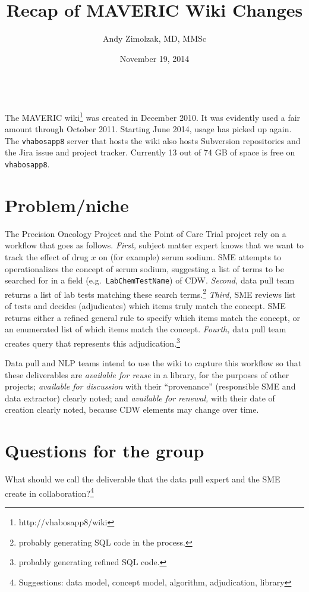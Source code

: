 \documentclass{tufte-handout}
\title{Recap of MAVERIC Wiki Changes}
\author{Andy Zimolzak, MD, MMSc}
\date{November 19, 2014}
\begin{document}
\maketitle

~\\

The MAVERIC wiki\footnote{http://vhabosapp8/wiki} was created in
December 2010. It was evidently used a fair amount through October
2011. Starting June 2014, usage has picked up again. The
\texttt{vhabosapp8} server that hosts the wiki also hosts Subversion
repositories and the Jira issue and project tracker. Currently 13 out
of 74 GB of space is free on \texttt{vhabosapp8}.

\section{Problem/niche}

The Precision Oncology Project and the Point of Care Trial project
rely on a workflow that goes as follows. \emph{First,} subject matter
expert knows that we want to track the effect of drug $x$ on (for
example) serum sodium. SME attempts to operationalizes the concept of
serum sodium, suggesting a list of terms to be searched for in a field
(e.g.\ \texttt{LabChemTestName}) of CDW. \emph{Second,} data pull team
returns a list of lab tests matching these search
terms.\footnote{probably generating SQL code in the process.}
\emph{Third,} SME reviews list of tests and decides (adjudicates)
which items truly match the concept. SME returns either a refined
general rule to specify which items match the concept, or an
enumerated list of which items match the concept. \emph{Fourth,} data
pull team creates query that represents this
adjudication.\footnote{probably generating refined SQL code.}

Data pull and NLP teams intend to use the wiki to capture this
workflow so that these deliverables are \emph{available for reuse} in
a library, for the purposes of other projects; \emph{available for
  discussion} with their ``provenance'' (responsible SME and data
extractor) clearly noted; and \emph{available for renewal,} with their
date of creation clearly noted, because CDW elements may change over
time.

\section{Questions for the group}

What should we call the deliverable that the data pull expert and the
SME create in collaboration?\footnote{Suggestions: data model, concept
model, algorithm, adjudication, library}
\end{document}
